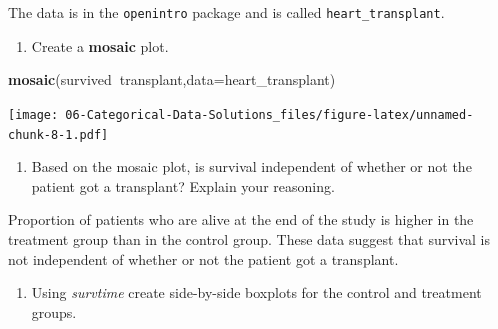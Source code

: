 \documentclass[
]{book}
\newenvironment{Shaded}{\begin{snugshade}}{\end{snugshade}}
\newcommand{\DataTypeTok}[1]{\textcolor[rgb]{0.13,0.29,0.53}{#1}}
\newcommand{\KeywordTok}[1]{\textcolor[rgb]{0.13,0.29,0.53}{\textbf{#1}}}
\newcommand{\NormalTok}[1]{#1}
\newcommand{\OperatorTok}[1]{\textcolor[rgb]{0.81,0.36,0.00}{\textbf{#1}}}
\newcommand{\StringTok}[1]{\textcolor[rgb]{0.31,0.60,0.02}{#1}}
\providecommand{\tightlist}{%
  \setlength{\itemsep}{0pt}\setlength{\parskip}{0pt}}
\begin{document}
The data is in the \texttt{openintro} package and is called \texttt{heart\_transplant}.

\begin{enumerate}
\def\labelenumi{\alph{enumi}.}
\tightlist
\item
  Create a \textbf{mosaic} plot.
\end{enumerate}

\begin{Shaded}
\begin{Highlighting}[]
\KeywordTok{mosaic}\NormalTok{(survived}\OperatorTok{~}\NormalTok{transplant,}\DataTypeTok{data=}\NormalTok{heart_transplant)}
\end{Highlighting}
\end{Shaded}

\texttt{[image: 06-Categorical-Data-Solutions\_files/figure-latex/unnamed-chunk-8-1.pdf]}

\begin{enumerate}
\def\labelenumi{\alph{enumi}.}
\setcounter{enumi}{1}
\tightlist
\item
  Based on the mosaic plot, is survival independent of whether or not the patient got a transplant? Explain your reasoning.
\end{enumerate}

Proportion of patients who are alive at the end of the study is higher in the treatment group than in the control group. These data suggest that survival is not independent of whether or not the patient got a transplant.

\begin{enumerate}
\def\labelenumi{\alph{enumi}.}
\setcounter{enumi}{2}
\tightlist
\item
  Using \emph{survtime} create side-by-side boxplots for the control and treatment groups.
\end{enumerate}

\begin{Shaded}
\end{Shaded}
\end{document}
